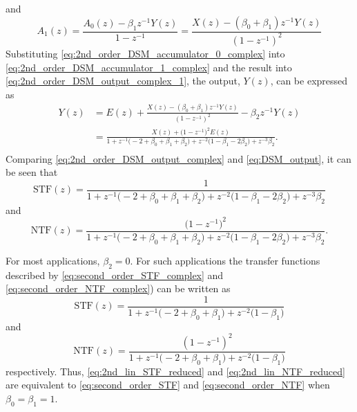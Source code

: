 and
\begin{equation}\label{eq:2nd_order_DSM_accumulator_1_complex}
  A_{1}(z) = \frac{A_{0}(z)-\beta_1 z^{-1}Y(z)}{1-z^{-1}}=\frac{X(z)-(\beta_0+\beta_1)
z^{-1}Y(z)}{\left(1-z^{-1}\right)^2}
\end{equation}
Substituting \eqref{eq:2nd_order_DSM_accumulator_0_complex} into 
\eqref{eq:2nd_order_DSM_accumulator_1_complex} and the result into 
\eqref{eq:2nd_order_DSM_output_complex_1}, the
output, $Y(z)$, can be expressed as 
\begin{equation}\label{eq:2nd_order_DSM_output_complex}
 \begin{split}
  Y(z)& = E(z)+\frac{X(z)-(\beta_0+\beta_1)
z^{-1}Y(z)}{\left(1-z^{-1}\right)^2}-\beta_2 z^{-1}Y(z) \\
       & = \frac{X(z)+ \bigl(1-z^{-1}\bigr)^2 E(z)}
{ 1+ z^{-1}\bigl(-2+\beta_0+\beta_1+\beta_2\bigr)
   + z^{-2}\bigl(1-\beta_1-2\beta_2\bigr)
   + z^{-3}\beta_2}.\\
 \end{split}
\end{equation}
Comparing \eqref{eq:2nd_order_DSM_output_complex} and \eqref{eq:DSM_output}, it can be
seen that
\begin{equation}\label{eq:second_order_STF_complex}
   \text{STF}(z)= \frac{1}{
  1+ z^{-1}\bigl(-2+\beta_0+\beta_1+\beta_2\bigr)
   + z^{-2}\bigl(1-\beta_1-2\beta_2\bigr)
   + z^{-3}\beta_2}
\end{equation}
and
\begin{equation}\label{eq:second_order_NTF_complex}
   \text{NTF}(z)=\frac{\bigl(1-z^{-1}\bigr)^2 }{
  1+ z^{-1}\bigl(-2+\beta_0+\beta_1+\beta_2\bigr)
   + z^{-2}\bigl(1-\beta_1-2\beta_2\bigr)
   + z^{-3}\beta_2}\text{.}
\end{equation}

For most applications, $\beta_2=0$. For such applications the transfer functions
described by \eqref{eq:second_order_STF_complex} and
\eqref{eq:second_order_NTF_complex}) can be written as
\begin{equation}\label{eq:2nd_lin_STF_reduced}
   \text{STF}(z)= \frac{1}{
  1+ z^{-1}\bigl(-2+\beta_0+\beta_1\bigr)
   + z^{-2}\bigl(1-\beta_1\bigr)}
\end{equation}
and
\begin{equation}\label{eq:2nd_lin_NTF_reduced}
   \text{NTF}(z)=\frac{\left(1-z^{-1}\right)^2 }{
  1+ z^{-1}\bigl(-2+\beta_0+\beta_1\bigr)
   + z^{-2}\bigl(1-\beta_1\bigr)}
\end{equation}
respectively. Thus, \eqref{eq:2nd_lin_STF_reduced} and
\eqref{eq:2nd_lin_NTF_reduced} are
equivalent to \eqref{eq:second_order_STF} and \eqref{eq:second_order_NTF} when
$\beta_0=\beta_1=1$.

